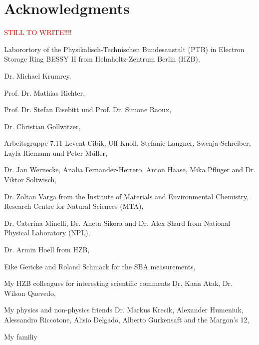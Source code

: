 \pagestyle{empty}
\noindent
\section*{Acknowledgments}

\textcolor{red}{STILL TO WRITE!!!!}
\vspace{2ex}

Laborortory of the Physikalisch-Technischen Bundesanstalt (PTB) in Electron Storage Ring BESSY II from Helmholtz-Zentrum Berlin (HZB),
\vspace{2ex}

\noindent Dr. Michael Krumrey,
\vspace{2ex}

\noindent Prof. Dr. Mathias Richter,
\vspace{2ex}

\noindent Prof. Dr. Stefan Eisebitt und Prof. Dr. Simone Raoux,
\vspace{2ex}

\noindent Dr. Christian Gollwitzer,
\vspace{2ex}

\noindent Arbeitsgruppe 7.11 Levent Cibik, Ulf Knoll, Stefanie Langner, Swenja Schreiber, Layla Riemann und Peter Müller,
\vspace{2ex}

\noindent Dr. Jan Wernecke, Analia Fernandez-Herrero, Anton Haase, Mika Pflüger and Dr. Viktor Soltwisch,
\vspace{2ex}

\noindent Dr. Zoltan Varga from the Institute of Materials and Environmental Chemistry, Research Centre for Natural Sciences (MTA),
\vspace{2ex}

\noindent Dr. Caterina Minelli, Dr. Aneta Sikora and Dr. Alex Shard from National Physical Laboratory (NPL),
\vspace{2ex}

\noindent Dr. Armin Hoell from HZB,
\vspace{2ex}

\noindent Eike Gericke and Roland Schmack for the SBA measurements,
\vspace{2ex}

\noindent My HZB colleagues for interesting scientific comments Dr. Kaan Atak, Dr. Wilson Quevedo,
\vspace{2ex}

\noindent My physics and non-physics friends Dr. Markus Krecik, Alexander Humeniuk, Alessandro Riccotone, Alisio Delgado, Alberto Gurkensaft and the Margon's 12,
\vspace{2ex}

\noindent My familiy


\cleardoublepage

